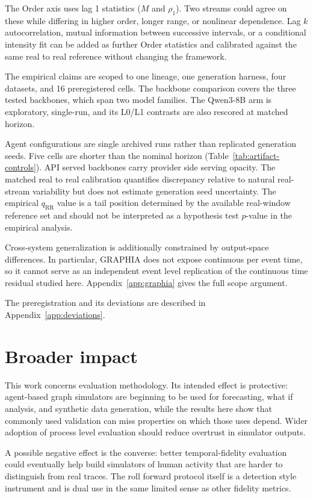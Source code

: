 The Order axis uses lag 1 statistics ($M$ and $\rho_1$). Two streams could
agree on these while differing in higher order, longer range, or nonlinear
dependence. Lag $k$ autocorrelation, mutual information between successive
intervals, or a conditional intensity fit can be added as further Order
statistics and calibrated against the same real to real reference without
changing the framework.

The empirical claims are scoped to one lineage, one generation harness, four
datasets, and 16 preregistered cells. The backbone comparison covers the three
tested backbones, which span two model families. The Qwen3-8B arm is exploratory, single-run, and its L0/L1
contrasts are also rescored at matched horizon.

Agent configurations are single archived runs rather than replicated
generation seeds. Five cells are shorter than the nominal horizon (Table~\ref{tab:artifact-controls}). API served
backbones carry provider side serving opacity. The matched real to real
calibration quantifies discrepancy relative to natural real-stream variability
but does not estimate generation seed uncertainty. The empirical
$q_{\mathrm{RR}}$ value is a tail position determined by the available
real-window reference set and should not be interpreted as a hypothesis test
$p$-value in the empirical analysis.

Cross-system generalization is additionally constrained by output-space
differences. In particular, GRAPHIA does not expose continuous per event time,
so it cannot serve as an independent event level replication of the
continuous time residual studied here. Appendix~\ref{app:graphia} gives the
full scope argument.

The preregistration and its deviations are described in
Appendix~\ref{app:deviations}.


\section{Broader impact}
\label{app:broader-impact}

This work concerns evaluation methodology. Its intended effect is protective:
agent-based graph simulators are beginning to be used for forecasting,
what if analysis, and synthetic data generation, while the results here show
that commonly used validation can miss properties on which those uses depend.
Wider adoption of process level evaluation should reduce overtrust in simulator
outputs.

A possible negative effect is the converse: better temporal-fidelity
evaluation could eventually help build simulators of human activity that are
harder to distinguish from real traces. The roll forward protocol itself is a
detection style instrument and is dual use in the same limited sense as other
fidelity metrics.
